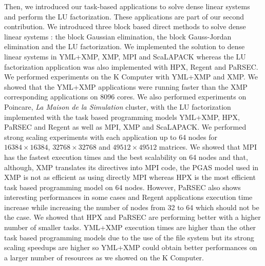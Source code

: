 Then, we introduced our task-based applications to solve dense linear systems and perform the LU factorization.
These applications are part of our second contribution.
We introduced three block based direct methods to solve dense linear systems : the block Gaussian elimination, the block Gauss-Jordan elimination and the LU factorization.
We implemented the solution to dense linear systems in YML+XMP, XMP, MPI and ScaLAPACK whereas the LU factorization application was also implemented with HPX, Regent and PaRSEC.
We performed experiments on the K Computer with YML+XMP and XMP.
We showed that the YML+XMP applications were running faster than the XMP corresponding applications on 8096 cores.
We also performed experiments on Poincare, \textit{La Maison de la Simulation} cluster, with the LU factorization implemented with the task based programming models YML+XMP, HPX, PaRSEC and Regent as well as MPI, XMP and ScaLAPACK.
We performed strong scaling experiments with each application up to 64 nodes for $16384 \times 16384$, $32768 \times 32768$ and $49512 \times 49512$ matrices.
We showed that MPI has the fastest execution times and the best scalability on 64 nodes and that, although, XMP translates its directives into MPI code, the PGAS model used in XMP is not as efficient as using directly MPI whereas HPX is the most efficient task based programming model on 64 nodes.
However, PaRSEC also shows interesting performances in some cases and Regent applications execution time increase while increasing the number of nodes from 32 to 64 which should not be the case.
We showed that HPX and PaRSEC are performing better with a higher number of smaller tasks.
YML+XMP execution times are higher than the other task based programming models due to the use of the file system but its strong scaling speedups are higher so YML+XMP could obtain better performances on a larger number of resources as we showed on the K Computer.

